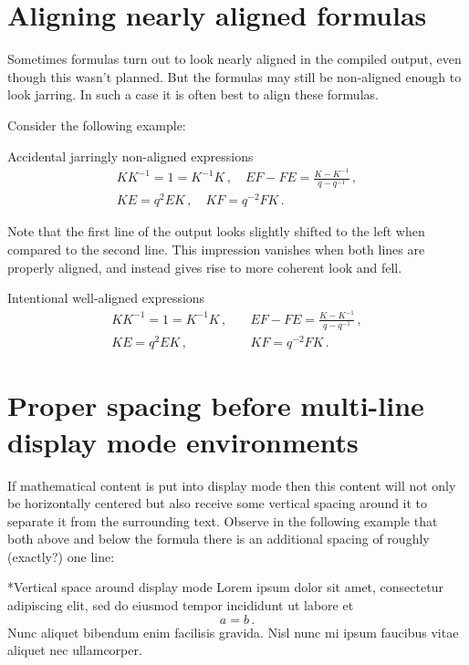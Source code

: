 




\section{Aligning nearly aligned formulas}

Sometimes formulas turn out to look nearly aligned in the compiled output, even though this wasn’t planned.
But the formulas may still be non-aligned enough to look jarring.
In such a case it is often best to align these formulas.

Consider the following example:
\begin{showlatex}{Accidental jarringly non-aligned expressions}
\begin{gather*}
  KK^{-1} = 1 = K^{-1}K \,,
  \quad
  EF - FE = \frac{ K - K^{-1} }{ q - q^{-1} } \,,
  \\
  KE = q^2 EK \,,
  \quad
  KF = q^{-2} FK \,.
\end{gather*}
\end{showlatex}
Note that the first line of the output looks slightly shifted to the left when compared to the second line.
This impression vanishes when both lines are properly aligned, and instead gives rise to more coherent look and fell.
\begin{showlatex}{Intentional well-aligned expressions}
\begin{align*}
  KK^{-1} = 1 = K^{-1}K \,,
  \quad
  &EF - FE = \frac{ K - K^{-1} }{ q - q^{-1} } \,,
  \\
  KE = q^2 EK \,,
  \quad
  &KF = q^{-2} FK \,.
\end{align*}
\end{showlatex}






\section{Proper spacing before multi-line display mode environments}
\label{spacing before multi-line}

If mathematical content is put into display mode then this content will not only be horizontally centered but also receive some vertical spacing around it to separate it from the surrounding text.
Observe in the following example that both above and below the formula there is an additional spacing of roughly (exactly?) one line:
\begin{showlatex}*{Vertical space around display mode}
Lorem ipsum dolor sit amet, consectetur adipiscing elit, sed do eiusmod tempor incididunt ut labore et
\[
  a = b \,.
\]
Nunc aliquet bibendum enim facilisis gravida. Nisl nunc mi ipsum faucibus vitae aliquet nec ullamcorper.
\end{showlatex}

